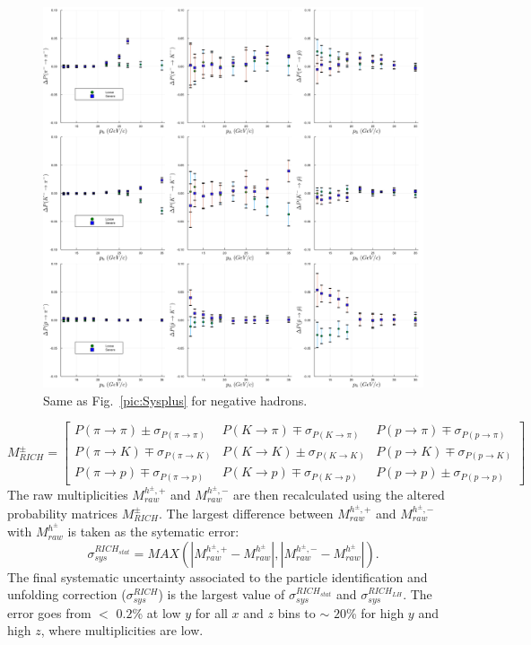 \begin{figure}[!p]
	\centering
	\includegraphics[scale=0.1]{./gfx/SysMinus.png}
	\caption{Same as Fig.~\ref{pic:Sysplus} for negative hadrons.}
	\label{pic:Sysminus}
\end{figure}
%
\begin{equation}
  M^{\pm}_{RICH}
  =
  \begin{bmatrix}
  P(\pi \rightarrow \pi)\pm\sigma_{P(\pi \rightarrow \pi)} & P(K \rightarrow \pi)\mp\sigma_{P(K \rightarrow \pi)} & P(p \rightarrow \pi)\mp\sigma_{P(p \rightarrow \pi)}\\
  P(\pi \rightarrow K)\mp\sigma_{P(\pi \rightarrow K)} & P(K \rightarrow K)\pm\sigma_{P(K \rightarrow K)} & P(p \rightarrow K)\mp\sigma_{P(p \rightarrow K)} \\
  P(\pi \rightarrow p)\mp\sigma_{P(\pi \rightarrow p)} & P(K \rightarrow p)\mp\sigma_{P(K \rightarrow p)} & P(p \rightarrow p)\pm\sigma_{P(p \rightarrow p)}
  \end{bmatrix}
	\label{eq:StatMat}
\end{equation}
%
The raw multiplicities $M^{h^{\pm},+}_{raw}$ and $M^{h^{\pm},-}_{raw}$ are then recalculated using the altered probability matrices $M^{\pm}_{RICH}$. The largest difference between
$M^{h^{\pm},+}_{raw}$ and $M^{h^{\pm},-}_{raw}$ with $M^{h^{\pm}}_{raw}$ is taken as the sytematic error:
%
\begin{equation}
  \sigma^{RICH_{stat}}_{sys} = MAX(|M^{h^{\pm},+}_{raw}-M^{h^{\pm}}_{raw}|,|M^{h^{\pm},-}_{raw}-M^{h^{\pm}}_{raw}|).
\end{equation}
%
The final systematic uncertainty associated to the particle identification and unfolding correction ($\sigma^{RICH}_{sys}$) is the largest value of $\sigma^{RICH_{stat}}_{sys}$ and $\sigma^{RICH_{LH}}_{sys}$. The error goes from $<$ $0.2$\% at low $y$ for all $x$ and $z$ bins to $\sim$ $20$\% for high $y$ and high $z$, where multiplicities are low.

